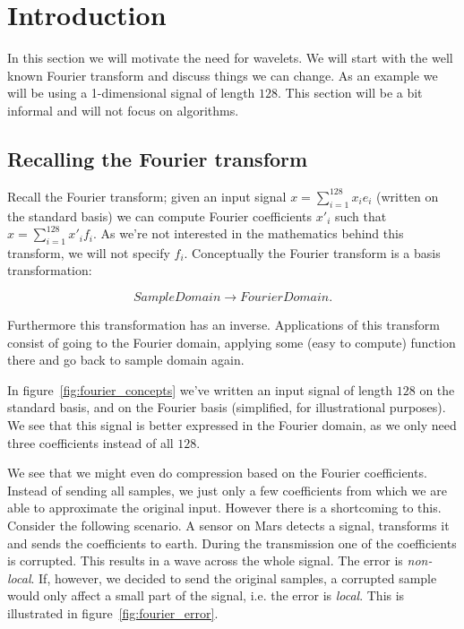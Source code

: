 
\section{Introduction}
\label{sec:intro}
In this section we will motivate the need for wavelets. We will start with the well known Fourier transform and discuss things we can change. As an example we will be using a 1-dimensional signal of length $128$. This section will be a bit informal and will not focus on algorithms.

\subsection{Recalling the Fourier transform}
Recall the Fourier transform; given an input signal $x = \sum_{i=1}^{128} x_i e_i$ (written on the standard basis) we can compute Fourier coefficients $x'_i$ such that $x = \sum_{i=1}^{128} x'_i f_i$. As we're not interested in the mathematics behind this transform, we will not specify $f_i$. Conceptually the Fourier transform is a basis transformation:

$$ SampleDomain \to FourierDomain. $$

Furthermore this transformation has an inverse. Applications of this transform consist of going to the Fourier domain, applying some (easy to compute) function there and go back to sample domain again.

In figure~\ref{fig:fourier_concepts} we've written an input signal of length $128$ on the standard basis, and on the Fourier basis (simplified, for illustrational purposes). We see that this signal is better expressed in the Fourier domain, as we only need three coefficients instead of all $128$.


We see that we might even do compression based on the Fourier coefficients. Instead of sending all samples, we just only a few coefficients from which we are able to approximate the original input. However there is a shortcoming to this. Consider the following scenario. A sensor on Mars detects a signal, transforms it and sends the coefficients to earth. During the transmission one of the coefficients is corrupted. This results in a wave across the whole signal. The error is \emph{non-local}. If, however, we decided to send the original samples, a corrupted sample would only affect a small part of the signal, i.e. the error is \emph{local}. This is illustrated in figure~\ref{fig:fourier_error}.

